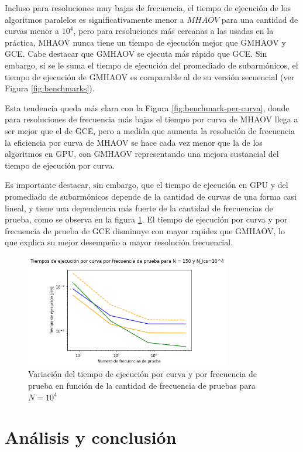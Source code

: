 Incluso para resoluciones muy bajas de frecuencia, el tiempo de ejecución de los algoritmos paralelos es significativamente menor a $MHAOV$ para una cantidad de curvas menor a $10^{4}$, pero para resoluciones más cercanas a las usadas en la práctica, MHAOV nunca tiene un tiempo de ejecución mejor que GMHAOV y GCE. Cabe destacar que GMHAOV se ejecuta más rápido que GCE. Sin embargo, si se le suma el tiempo de ejecución del promediado de subarmónicos, el tiempo de ejecución de GMHAOV es comparable al de su versión secuencial (ver Figura \ref{fig:benchmarks}).

Esta tendencia queda más clara con la Figura \ref{fig:benchmark-per-curva}, donde para resoluciones de frecuencia más bajas el tiempo por curva de MHAOV llega a ser mejor que el de GCE, pero a medida que aumenta la resolución de frecuencia la eficiencia por curva de  MHAOV se hace cada vez menor que la de los algoritmos en GPU, con GMHAOV representando una mejora sustancial del tiempo de ejecución por curva.

Es importante destacar, sin embargo, que el tiempo de ejecución en GPU y del promediado de subarmónicos depende de la cantidad de curvas de una forma casi lineal, y tiene una dependencia más fuerte de la cantidad de frecuencias de prueba, como se observa en la figura \ref{fig:benchmark-frecuencias-prueba}. El tiempo de ejecución por curva y por frecuencia de prueba de GCE disminuye con mayor rapidez que GMHAOV, lo que explica su mejor desempeño a mayor resolución frecuencial.

\begin{figure}[H]
    \centering
    \includegraphics[width=0.8\textwidth]{figs/benchmarks-frequency.png}
    \caption{Variación del tiempo de ejecución por curva y por frecuencia de prueba en función de la cantidad de frecuencia de pruebas para $N=10^{4}$}
    \label{fig:benchmark-frecuencias-prueba}
\end{figure}

\chapter{Análisis y conclusión}\label{chap:conclusión}

